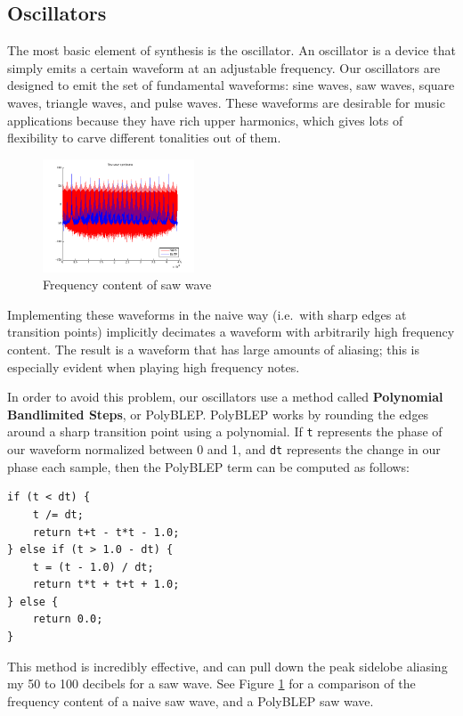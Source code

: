 \documentclass[letterpaper,12pt]{article}
\begin{document}
\subsection{Oscillators}

The most basic element of synthesis is the oscillator. An oscillator is a device that simply emits a certain waveform at an adjustable frequency. Our oscillators are designed to emit the set of fundamental waveforms: sine waves, saw waves, square waves, triangle waves, and pulse waves. These waveforms are desirable for music applications because they have rich upper harmonics, which gives lots of flexibility to carve different tonalities out of them.

\begin{figure}
\centering
\includegraphics[width=0.4\textwidth]{figures/blep-spectrum.png}
\caption{Frequency content of saw wave}
\label{fig:polyblep-spectrum}
\end{figure}

Implementing these waveforms in the naive way (i.e.\ with sharp edges at transition points) implicitly decimates a waveform with arbitrarily high frequency content. The result is a waveform that has large amounts of aliasing; this is especially evident when playing high frequency notes.


In order to avoid this problem, our oscillators use a method called \textbf{Polynomial Bandlimited Steps}, or PolyBLEP\cite{polyblep}. PolyBLEP works by rounding the edges around a sharp transition point using a polynomial. If \texttt{t} represents the phase of our waveform normalized between 0 and 1, and \texttt{dt} represents the change in our phase each sample, then the PolyBLEP term can be computed as follows:

\begin{verbatim}
if (t < dt) {
    t /= dt;
    return t+t - t*t - 1.0;
} else if (t > 1.0 - dt) {
    t = (t - 1.0) / dt;
    return t*t + t+t + 1.0;
} else {
    return 0.0;
}
\end{verbatim}

This method is incredibly effective, and can pull down the peak sidelobe aliasing my 50 to 100 decibels for a saw wave. See Figure \ref{fig:polyblep-spectrum} for a comparison of the frequency content of a naive saw wave, and a PolyBLEP saw wave.
\end{document}
